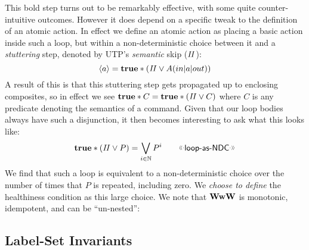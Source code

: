 This bold step turns out to be remarkably effective,
with some quite counter-intuitive outcomes.
However it does depend on a specific tweak to the
definition of an atomic action.
In effect we define an atomic action
as placing a basic action inside such a loop,
but within a non-deterministic choice between it
and a \emph{stuttering} step, denoted by UTP's \emph{semantic} skip ($\mathit{II}$):
\[
  \langle a\rangle = \mathbf{true} * (\mathit{II} \lor A(in|a|out))
\]
A result of this is that this stuttering step gets
propagated up to enclosing composites,
so in effect we see $\mathbf{true} * C = \mathbf{true} * (\mathit{II}\lor C)$
where $C$ is any predicate denoting the semantics of a command.
Given that our loop bodies always have such a disjunction,
it then becomes interesting to ask what this looks like:
\[
  \true * (\Skip \lor P) = \bigvee_{i \in \Nat} P^i
  \qquad \elabel{loop-as-NDC}
\]
We find that such a loop is equivalent to a non-deterministic
choice over the number of times that $P$ is repeated,
including zero.
We \emph{choose to define} the healthiness condition as
this large choice.
 \noindent 
We note that $\mathbf{WwW}$ is monotonic, idempotent,
and can be ``un-nested'':

\subsection{Label-Set Invariants}


